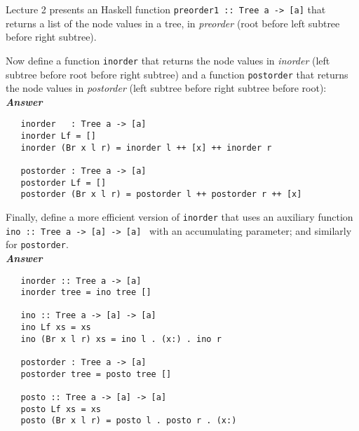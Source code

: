\documentclass[a4paper]{article}
\begin{document}
\begin{exercise}\label{exer-tree-traversal}
  Lecture 2 presents an Haskell function \texttt{preorder1 ::\ Tree a ->
    [a]} that returns a list of the node values in a tree, in
  \emph{preorder} (root before left subtree before right subtree).
  
  Now define a function \texttt{inorder} that returns the node values
  in \emph{inorder} (left subtree before root before right subtree)
  and a function \texttt{postorder} that returns the node values in
  \emph{postorder} (left subtree before right subtree before root):\\
  
\noindent
\textbf{\emph{Answer}}
{\codesetup\begin{verbatim}
   inorder   : Tree a -> [a]
   inorder Lf = []
   inorder (Br x l r) = inorder l ++ [x] ++ inorder r
   
   postorder : Tree a -> [a]
   postorder Lf = []
   postorder (Br x l r) = postorder l ++ postorder r ++ [x]
\end{verbatim}}

\noindent 
Finally, define a more efficient version of \texttt{inorder} that
  uses an auxiliary function \texttt{ino ::\ Tree a -> [a] -> [a]
    } with an accumulating parameter; and similarly for
  \texttt{postorder}.  \\
  
  \noindent
\textbf{\emph{Answer}}
{\codesetup\begin{verbatim}
   inorder :: Tree a -> [a]
   inorder tree = ino tree []
   
   ino :: Tree a -> [a] -> [a]
   ino Lf xs = xs
   ino (Br x l r) xs = ino l . (x:) . ino r
   
   postorder : Tree a -> [a]
   postorder tree = posto tree []
   
   posto :: Tree a -> [a] -> [a]
   posto Lf xs = xs
   posto (Br x l r) = posto l . posto r . (x:)
\end{verbatim}}
\end{exercise}
\end{document}
